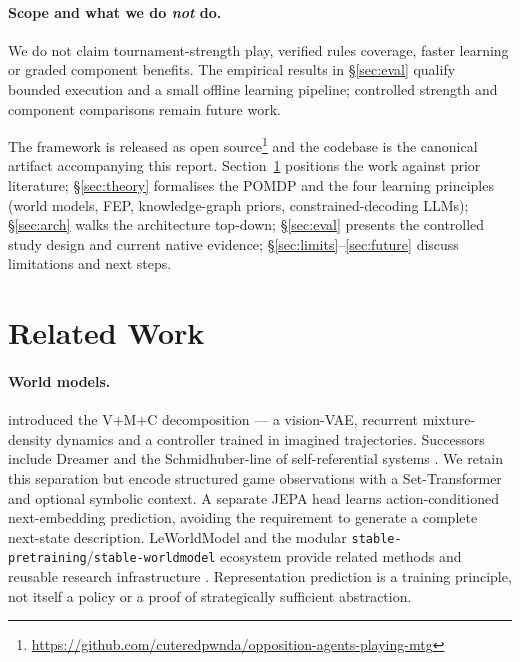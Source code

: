 \documentclass[11pt,a4paper]{article}
\theoremstyle{definition}
\theoremstyle{plain}
\begin{document}
\paragraph{Scope and what we do \emph{not} do.} We do not claim tournament-strength play, verified rules coverage, faster learning or graded component benefits. The empirical results in \S\ref{sec:eval} qualify bounded execution and a small offline learning pipeline; controlled strength and component comparisons remain future work.

The framework is released as open source\footnote{\url{https://github.com/cuteredpwnda/opposition-agents-playing-mtg}} and the codebase is the canonical artifact accompanying this report. Section~\ref{sec:related} positions the work against prior literature; \S\ref{sec:theory} formalises the POMDP and the four learning principles (world models, FEP, knowledge-graph priors, constrained-decoding LLMs); \S\ref{sec:arch} walks the architecture top-down; \S\ref{sec:eval} presents the controlled study design and current native evidence; \S\ref{sec:limits}--\ref{sec:future} discuss limitations and next steps.

\section{Related Work}
\label{sec:related}

\paragraph{World models.} \citet{ha2018world} introduced the V+M+C decomposition --- a vision-VAE, recurrent mixture-density dynamics and a controller trained in imagined trajectories. Successors include Dreamer \citep{hafner2020dream, hafner2023dreamerv3} and the Schmidhuber-line of self-referential systems \citep{schmidhuber2015learning, irie2022neural}. We retain this separation but encode structured game observations with a Set-Transformer and optional symbolic context. A separate JEPA head \citep{lecun2022path, assran2023ijepa} learns action-conditioned next-embedding prediction, avoiding the requirement to generate a complete next-state description. LeWorldModel and the modular \texttt{stable-pretraining}/\texttt{stable-worldmodel} ecosystem provide related methods and reusable research infrastructure \citep{balestriero2025stable, maes_lelidec2026swm, maes_lelidec2026lewm}. Representation prediction is a training principle, not itself a policy or a proof of strategically sufficient abstraction.
\end{document}
